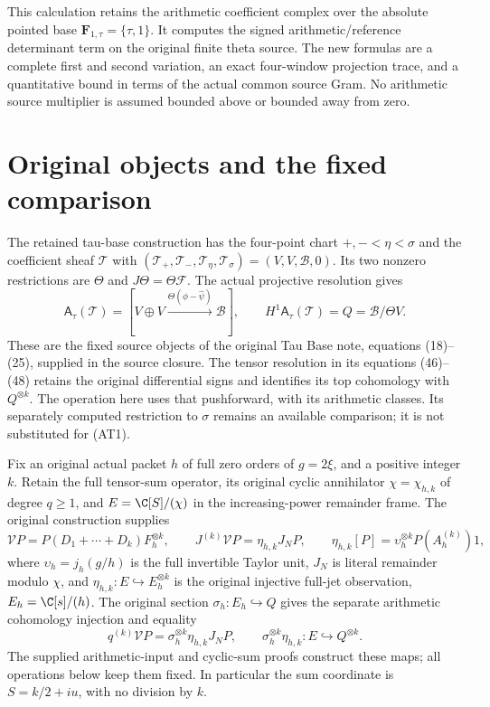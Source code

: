 This calculation retains the arithmetic coefficient complex over the
absolute pointed base $\mathbf F_{1,\tau}=\{\tau,1\}$. It computes the
signed arithmetic/reference determinant term on the original finite
theta source. The new formulas are a complete first and second variation,
an exact four-window projection trace, and a quantitative bound in terms
of the actual common source Gram. No arithmetic source multiplier is
assumed bounded above or bounded away from zero.

\section{Original objects and the fixed comparison}

The retained tau-base construction has the four-point chart
$+,-<\eta<\sigma$ and the coefficient sheaf $\mathcal T$ with
$(\mathcal T_+,\mathcal T_-,\mathcal T_\eta,\mathcal T_\sigma)
=(V,V,\mathscr B,0)$. Its two nonzero restrictions are $\Theta$ and
$J\Theta=\Theta\mathcal F$. The actual projective resolution gives
\[
 \mathsf A_\tau(\mathcal T)
 =[V\oplus V\xrightarrow{\Theta(\phi-\widehat\psi)}\mathscr B],
 \qquad H^1\mathsf A_\tau(\mathcal T)=Q=\mathscr B/\Theta V.
 \tag{AT1}
\]
These are the fixed source objects of the original Tau Base note,
equations (18)--(25), supplied in the source closure. The tensor
resolution in its equations (46)--(48) retains the original differential
signs and identifies its top cohomology with $Q^{\otimes k}$.
The operation here uses that pushforward, with its arithmetic classes.
Its separately computed restriction to $\sigma$ remains an available
comparison; it is not substituted for (AT1).

Fix an original actual packet $h$ of full zero orders of $g=2\xi$,
and a positive integer $k$. Retain the full tensor-sum operator,
its original cyclic annihilator $\chi=\chi_{h,k}$ of degree $q\ge1$,
and $E=\C[S]/(\chi)$ in the increasing-power remainder frame.
The original construction supplies
\[
 \mathcal V P=P(D_1+\cdots+D_k)F_h^{\otimes k},\qquad
 J^{(k)}\mathcal V P=\eta_{h,k}J_NP,\qquad
 \eta_{h,k}[P]=\upsilon_h^{\otimes k}P(A_h^{(k)})1,
 \tag{AT2}
\]
where $\upsilon_h=j_h(g/h)$ is the full invertible Taylor unit,
$J_N$ is literal remainder modulo $\chi$, and
$\eta_{h,k}:E\hookrightarrow E_h^{\otimes k}$ is the original
injective full-jet observation, $E_h=\C[s]/(h)$.
The original section $\sigma_h:E_h\hookrightarrow Q$ gives the
separate arithmetic cohomology injection and equality
\[
 q^{(k)}\mathcal V P=\sigma_h^{\otimes k}\eta_{h,k}J_NP,
 \qquad \sigma_h^{\otimes k}\eta_{h,k}:E\hookrightarrow Q^{\otimes k}.
 \tag{AT2a}
\]
The supplied arithmetic-input and cyclic-sum proofs construct these
maps; all operations below keep them fixed. In
particular the sum coordinate is $S=k/2+iu$, with no division by $k$.

